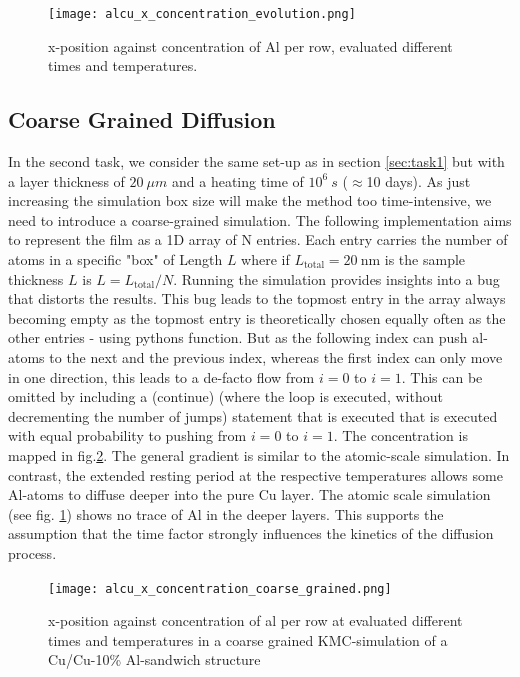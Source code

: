 \begin{figure}[htb]
	\centering
	\texttt{[image: alcu\_x\_concentration\_evolution.png]}
	\caption{x-position against concentration of Al per row, evaluated different times and temperatures. }
	\label{fig:alcu_time_concentration_plot}
\end{figure}
\FloatBarrier

\subsection{Coarse Grained Diffusion}
In the second task, we consider the same set-up as in section \ref{sec:task1} but with a layer thickness of \(20~\mu m \) and a heating time of \(10^{6}~s\) (\(\approx\)10 days). As just increasing the simulation box size will make the method too time-intensive, we need to introduce a coarse-grained simulation. The following implementation aims to represent the film as a 1D array of N entries. Each entry carries the number of atoms in a specific "box" of Length \(L\) where if \(L_{\mathrm{total}} = 20~\mathrm{nm}\) is the sample thickness \( L \) is \( L = L_{\mathrm{total}}/N \). Running the simulation provides insights into a bug that distorts the results. This bug leads to the topmost entry in the array always becoming empty as the topmost entry is theoretically chosen equally often as the other entries - using pythons  function. But as the following index can push al-atoms to the next and the previous index, whereas the first index can only move in one direction, this leads to a de-facto flow from \(i = 0\)  to \(i = 1\). This can be omitted by including a \code(continue) (where the  loop is executed, without decrementing the number of jumps) statement that is executed that is executed with equal probability to pushing from \(i = 0 \) to \(i = 1\). The concentration is mapped in fig.\ref{fig:alcu_coarse_grained_plot}. The general gradient is similar to the atomic-scale simulation. In contrast, the extended resting period at the respective temperatures allows some Al-atoms to diffuse deeper into the pure Cu layer. The atomic scale simulation (see fig. \ref{fig:alcu_time_concentration_plot}) shows no trace of Al in the deeper layers. This supports the assumption that the time factor strongly influences the kinetics of the diffusion process.

\begin{figure}[htb]
	\centering
	\texttt{[image: alcu\_x\_concentration\_coarse\_grained.png]}
	\caption{x-position against concentration of al per row at evaluated different times and temperatures in a coarse grained KMC-simulation of a Cu/Cu-10\% Al-sandwich structure}
	\label{fig:alcu_coarse_grained_plot}
\end{figure}

\printbibliography


